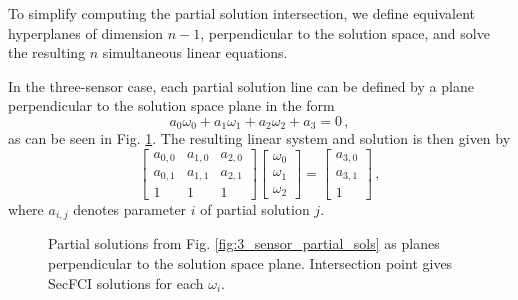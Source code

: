 \documentclass[letterpaper, 10 pt, conference]{ieeeconf}  %
\begin{document}
To simplify computing the partial solution intersection, we define equivalent hyperplanes of dimension $n-1$, perpendicular to the solution space, and solve the resulting $n$ simultaneous linear equations.

In the three-sensor case, each partial solution line can be defined by a plane perpendicular to the solution space plane in the form
\begin{equation}
   a_0\omega_0 + a_1\omega_1 +a_2\omega_2 + a_3 = 0\,, \label{eqn:3sen_plane_eq}
\end{equation}
as can be seen in Fig. \ref{fig:3sen_planes}. The resulting linear system and solution is then given by
\begin{equation}
   \begin{bmatrix}
      a_{0,0} & a_{1,0} & a_{2,0} \\
      a_{0,1} & a_{1,1} & a_{2,1} \\
      1 & 1 & 1
   \end{bmatrix}
   \begin{bmatrix}
      \omega_0 \\
      \omega_1 \\
      \omega_2
   \end{bmatrix}
   =
   \begin{bmatrix}
      a_{3,0} \\
      a_{3,1} \\
      1
   \end{bmatrix}\,, \label{eqn:3sen_plane_sol_eq}
\end{equation}
where $a_{i,j}$ denotes parameter $i$ of partial solution $j$.
\begin{figure}[tb]
   \vspace{-30pt}
   \begin{center}
      
   \end{center}
   \vspace{-10pt}
   \caption{Partial solutions from Fig. \ref{fig:3_sensor_partial_sols} as planes perpendicular to the solution space plane. Intersection point gives SecFCI solutions for each $\omega_i$.}
   \label{fig:3sen_planes}
\end{figure}
\end{document}
